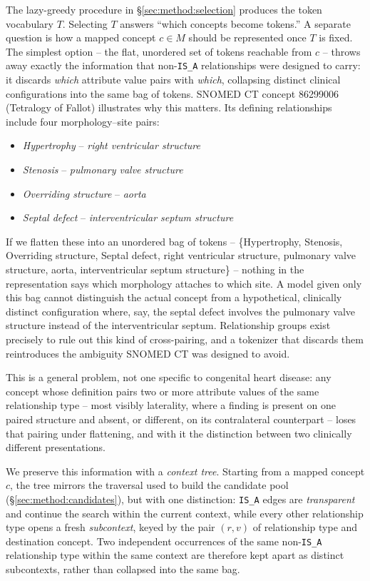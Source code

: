 The lazy-greedy procedure in \S\ref{sec:method:selection} produces the token vocabulary $T$. Selecting $T$ answers ``which concepts become tokens.'' A separate question is how a mapped concept $c \in M$ should be represented once $T$ is fixed. The simplest option -- the flat, unordered set of tokens reachable from $c$ -- throws away exactly the information that non-\texttt{IS\_A} relationships were designed to carry: it discards \emph{which} attribute value pairs with \emph{which}, collapsing distinct clinical configurations into the same bag of tokens. SNOMED CT concept 86299006 (Tetralogy of Fallot) illustrates why this matters. Its defining relationships include four morphology--site pairs:
\begin{itemize}
    \item \emph{Hypertrophy} -- \emph{right ventricular structure}
    \item \emph{Stenosis} -- \emph{pulmonary valve structure}
    \item \emph{Overriding structure} -- \emph{aorta}
    \item \emph{Septal defect} -- \emph{interventricular septum structure}
\end{itemize}

If we flatten these into an unordered bag of tokens -- \{Hypertrophy, Stenosis, Overriding structure, Septal defect, right ventricular structure, pulmonary valve structure, aorta, interventricular septum structure\} -- nothing in the representation says which morphology attaches to which site. A model given only this bag cannot distinguish the actual concept from a hypothetical, clinically distinct configuration where, say, the septal defect involves the pulmonary valve structure instead of the interventricular septum. Relationship groups exist precisely to rule out this kind of cross-pairing, and a tokenizer that discards them reintroduces the ambiguity SNOMED CT was designed to avoid.

This is a general problem, not one specific to congenital heart disease: any concept whose definition pairs two or more attribute values of the same relationship type -- most visibly laterality, where a finding is present on one paired structure and absent, or different, on its contralateral counterpart -- loses that pairing under flattening, and with it the distinction between two clinically different presentations.

We preserve this information with a \emph{context tree}. Starting from a mapped concept $c$, the tree mirrors the traversal used to build the candidate pool (\S\ref{sec:method:candidates}), but with one distinction: \texttt{IS\_A} edges are \emph{transparent} and continue the search within the current context, while every other relationship type opens a fresh \emph{subcontext}, keyed by the pair $(r, v)$ of relationship type and destination concept. Two independent occurrences of the same non-\texttt{IS\_A} relationship type within the same context are therefore kept apart as distinct subcontexts, rather than collapsed into the same bag.


